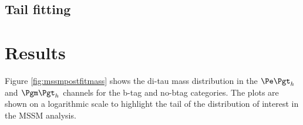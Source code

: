 \subsection{Tail fitting}


\section{Results}

Figure \ref{fig:mssmpostfitmass} shows the di-tau mass distribution in the
$\etau$ and $\mutau$ channels for the b-tag and no-btag categories. The plots
are shown on a logarithmic scale to highlight the tail of the distribution of
interest in the \ac{MSSM} analysis.


\begin{figure}[tbh]


\end{figure}
